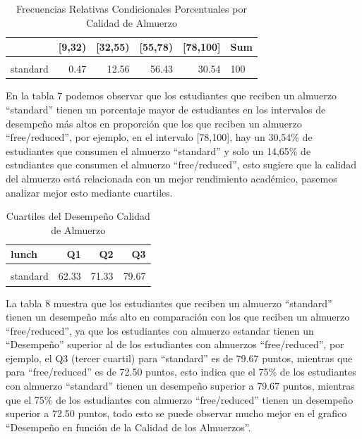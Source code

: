 \documentclass[
]{article}
\begin{document}
\begin{table}[!h]
\centering
\caption{\label{tab:tabla de frecuencias relativas porcentuales condicionales 2 }Frecuencias Relativas Condicionales Porcentuales por Calidad de Almuerzo}
\centering
\begin{tabular}[t]{lrrrrl}
\toprule
  & {}[9,32) & {}[32,55) & {}[55,78) & {}[78,100] & Sum\\
\midrule
\cellcolor{gray!10}{free/reduced} & \cellcolor{gray!10}{3.10} & \cellcolor{gray!10}{27.04} & \cellcolor{gray!10}{55.21} & \cellcolor{gray!10}{14.65} & \cellcolor{gray!10}{100}\\
standard & 0.47 & 12.56 & 56.43 & 30.54 & 100\\
\bottomrule
\end{tabular}
\end{table}

En la tabla 7 podemos observar que los estudiantes que reciben un
almuerzo ``standard'' tienen un porcentaje mayor de estudiantes en los
intervalos de desempeño más altos en proporción que los que reciben un
almuerzo ``free/reduced'', por ejemplo, en el intervalo {[}78,100{]},
hay un 30,54\% de estudiantes que consumen el almuerzo ``standard'' y
solo un 14,65\% de estudiantes que consumen el almuerzo
``free/reduced'', esto sugiere que la calidad del almuerzo está
relacionada con un mejor rendimiento académico, pasemos analizar mejor
esto mediante cuartiles.

\begin{table}[!h]
\centering
\caption{\label{tab:cuartiles2}Cuartiles del Desempeño Calidad de Almuerzo}
\centering
\begin{tabular}[t]{lrrr}
\toprule
lunch & Q1 & Q2 & Q3\\
\midrule
\cellcolor{gray!10}{free/reduced} & \cellcolor{gray!10}{52.84} & \cellcolor{gray!10}{62.67} & \cellcolor{gray!10}{72.50}\\
standard & 62.33 & 71.33 & 79.67\\
\bottomrule
\end{tabular}
\end{table}

La tabla 8 muestra que los estudiantes que reciben un almuerzo
``standard'' tienen un desempeño más alto en comparación con los que
reciben un almuerzo ``free/reduced'', ya que los estudiantes con
almuerzo estandar tienen un ``Desempeño'' superior al de los estudiantes
con almuerzos ``free/reduced'', por ejemplo, el Q3 (tercer cuartil) para
``standard'' es de 79.67 puntos, mientras que para ``free/reduced'' es
de 72.50 puntos, esto indica que el 75\% de los estudiantes con almuerzo
``standard'' tienen un desempeño superior a 79.67 puntos, mientras que
el 75\% de los estudiantes con almuerzo ``free/reduced'' tienen un
desempeño superior a 72.50 puntos, todo esto se puede observar mucho
mejor en el grafico ``Desempeño en función de la Calidad de los
Almuerzos''.
\end{document}
